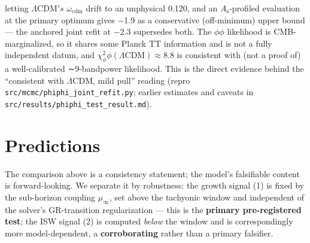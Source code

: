 \documentclass[preprint,12pt]{elsarticle}
\begin{document}
letting \(\Lambda \mathrm{CDM}'s\) \(\omega _{\mathrm{cdm}}\) drift to
an unphysical 0.120, and an \(A_{\mathrm{s}}\)-profiled evaluation at
the primary optimum gives −1.9 as a conservative (off-minimum) upper
bound --- the anchored joint refit at \(-2.3\) supersedes both. The
\(\phi \phi\) likelihood is CMB-marginalized, so it shares some Planck
TT information and is not a fully independent datum, and
\(\chi ^{2}_\phi \phi (\Lambda \mathrm{CDM}) \approx  8.8\) is
consistent with (not a proof of) a well-calibrated ∼9-bandpower
likelihood. This is the direct evidence behind the ``consistent with
\(\Lambda \mathrm{CDM}\), mild pull'' reading (repro
\texttt{src/\allowbreak mcmc/\allowbreak phiphi\_\allowbreak joint\_\allowbreak refit.\allowbreak py}; earlier estimates and caveats
in \texttt{src/\allowbreak results/\allowbreak phiphi\_\allowbreak test\_\allowbreak result.\allowbreak md}).

\section{Predictions}\label{sec-6}

The comparison above is a consistency statement; the model's falsifiable
content is forward-looking. We separate it by robustness: the growth
signal (1) is fixed by the sub-horizon coupling \(\mu _\infty\), set
above the tachyonic window and independent of the solver's GR-transition
regularization --- this is the \textbf{primary pre-registered test}; the
ISW signal (2) is computed \emph{below} the window and is
correspondingly more model-dependent, a \textbf{corroborating} rather
than a primary falsifier.
\end{document}
